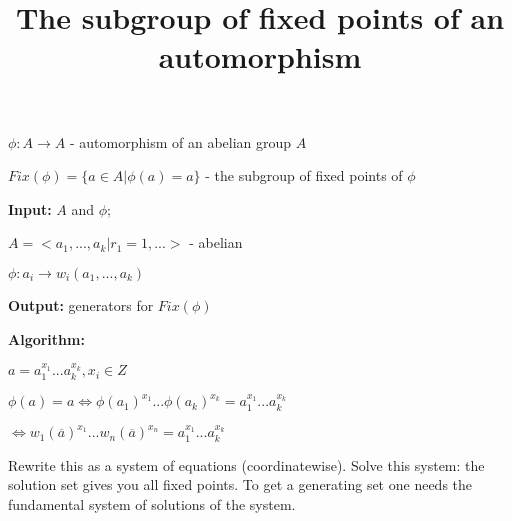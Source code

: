 \documentclass[12pt]{article}
\title{\bf{The subgroup of fixed points of an automorphism}}
\date{}
\begin{document}
\maketitle


\noindent
$\phi : A \rightarrow A$ - automorphism of an abelian group $A$

\noindent
$Fix(\phi) = \{a \in A | \phi(a) = a\}$
- the subgroup of fixed points of $\phi$

\vspace{3mm}
\noindent
{\bf Input:} $A$ and $\phi$; 

\noindent
$A = <a_1, ..., a_k | r_1 = 1, ... >$ - abelian  

\noindent
$\phi : a_i \rightarrow w_i(a_1,...,a_k)$

\vspace{3mm}
\noindent
{\bf Output:} generators for $Fix(\phi)$

\vspace{3mm}
\noindent
{\bf Algorithm: }

\noindent
$a = a_1^{x_1} ... a_k^{x_k}, x_i \in Z$

\noindent
$\phi(a) = a \Leftrightarrow \phi(a_1)^{x_1} ... \phi(a_k)^{x_k} = 
a_1^{x_1} ... a_k^{x_k}$

\noindent
$\Leftrightarrow w_1(\overline{a})^{x_1} ... w_n(\overline{a})^{x_n} 
= a_1^{x_1} ... a_k^{x_k}$

\vspace{3mm}
\noindent
Rewrite this as a system of equations (coordinatewise). Solve this
system: the solution set gives you all fixed points.  To get a
generating set one needs the fundamental system of solutions of the
system.
\end{document}
